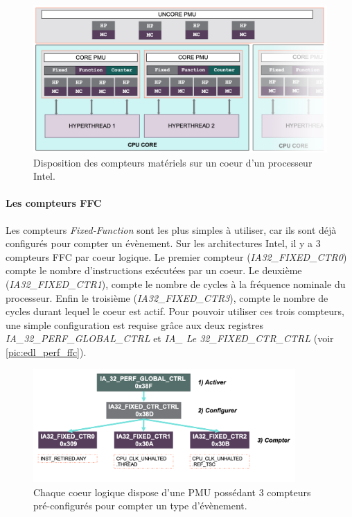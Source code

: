         \begin{figure}
        \center
        \includegraphics[width=12cm]{images/edl_perf_pmu.png}
        \caption{\label{pic:edl_perf_pmu} Disposition des compteurs matériels sur un coeur d'un processeur Intel.}
        \end{figure}
    
        \paragraph{Les compteurs FFC}
        Les compteurs \textit{Fixed-Function} sont les plus simples à utiliser, car ils sont déjà configurés pour compter un évènement. Sur les architectures Intel, il y a 3 compteurs FFC par coeur logique. Le premier compteur (\textit{IA32\_FIXED\_CTR0}) compte le nombre d'instructions exécutées par un coeur. Le deuxième (\textit{IA32\_FIXED\_CTR1}), compte le nombre de cycles à la fréquence nominale du processeur. Enfin le troisième (\textit{IA32\_FIXED\_CTR3}), compte le nombre de cycles durant lequel le coeur est actif. Pour pouvoir utiliser ces trois compteurs, une simple configuration est requise grâce aux deux registres \textit{IA\_32\_PERF\_GLOBAL\_CTRL} et \textit{IA\_ Le 32\_FIXED\_CTR\_CTRL} (voir \autoref{pic:edl_perf_ffc}). 
        
        \begin{figure}[h!]
        \center
        \includegraphics[width=10cm]{images/edl_perf_ffc.png}
        \caption{\label{pic:edl_perf_ffc} Chaque coeur logique dispose d'une PMU possédant 3 compteurs pré-configurés pour compter un type d'évènement.}
        \end{figure}
        
